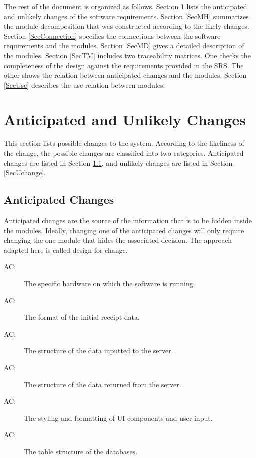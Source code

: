 \documentclass[12pt, titlepage]{article}
\newcounter{acnum}
\newcommand{\actheacnum}{AC\theacnum}
\begin{document}
The rest of the document is organized as follows. Section
\ref{SecChange} lists the anticipated and unlikely changes of the software
requirements. Section \ref{SecMH} summarizes the module decomposition that
was constructed according to the likely changes. Section \ref{SecConnection}
specifies the connections between the software requirements and the
modules. Section \ref{SecMD} gives a detailed description of the
modules. Section \ref{SecTM} includes two traceability matrices. One checks
the completeness of the design against the requirements provided in the SRS. The
other shows the relation between anticipated changes and the modules. Section
\ref{SecUse} describes the use relation between modules.

\section{Anticipated and Unlikely Changes} \label{SecChange}

This section lists possible changes to the system. According to the likeliness
of the change, the possible changes are classified into two
categories. Anticipated changes are listed in Section \ref{SecAchange}, and
unlikely changes are listed in Section \ref{SecUchange}.

\subsection{Anticipated Changes} \label{SecAchange}

Anticipated changes are the source of the information that is to be hidden
inside the modules. Ideally, changing one of the anticipated changes will only
require changing the one module that hides the associated decision. The approach
adapted here is called design for
change.

\begin{description}
\item[ \actheacnum \label{acHardware}:] The specific hardware on which the software is running.
\item[ \actheacnum \label{acInput}:] The format of the initial receipt data.
\item[ \actheacnum \label{acAPIReq}:] The structure of the data inputted to the server.
\item[ \actheacnum \label{acAPIRes}:] The structure of the data returned from the server.
\item[ \actheacnum \label{acFormat}:] The styling and formatting of UI components and user input.
\item[ \actheacnum \label{acDB}:] The table structure of the databases.
\end{description}
\end{document}
